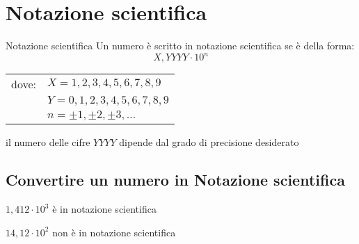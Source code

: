 \chapter{Notazione scientifica}
\label{cha:NotazioneScientifica}
\begin{definizionet}{Notazione scientifica}{}
Un numero è scritto in notazione scientifica se è della forma:
\[X,YYYY \cdot 10^n \]
\begin{tabular}{ll}
dove:&    $X=1,2,3,4,5,6,7,8,9$  \\ 
	    &     $ Y=0,1,2,3,4,5,6,7,8,9$ \\ 
	   &  $n=\pm 1, \pm 2,\pm 3,\ldots$\\
\end{tabular}
 
il numero delle cifre $YYYY$ dipende dal grado di precisione desiderato
\end{definizionet}
\section{Convertire un numero in Notazione scientifica}
\begin{esempiot}{}{}
	$1,412\cdot 10^3$ è in notazione scientifica
	
	$14,12\cdot 10^2$ non è in notazione scientifica
\end{esempiot}